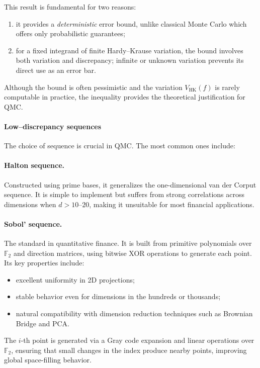 This result is fundamental for two reasons:
\begin{enumerate}
    \item it provides a \emph{deterministic} error bound, unlike classical Monte Carlo which offers only probabilistic guarantees;
    \item for a fixed integrand of finite Hardy--Krause variation,
          the bound involves both variation and discrepancy; infinite
          or unknown variation prevents its direct use as an error bar.
\end{enumerate}
Although the bound is often pessimistic and the variation $V_{\mathrm{HK}}(f)$ is rarely computable in practice, the inequality provides the theoretical justification for QMC.
\paragraph{Low--discrepancy sequences}

The choice of sequence is crucial in QMC. The most common ones include:

\paragraph{Halton sequence.}
Constructed using prime bases, it generalizes the one-dimensional van der Corput sequence.  
It is simple to implement but suffers from strong correlations across dimensions when $d>10$--$20$, making it unsuitable for most financial applications.

\paragraph{Sobol' sequence.}
The standard in quantitative finance.  
It is built from primitive polynomials over $\mathbb{F}_2$ and direction matrices, using bitwise XOR operations to generate each point.  
Its key properties include:
\begin{itemize}
    \item excellent uniformity in 2D projections;
    \item stable behavior even for dimensions in the hundreds or thousands;
    \item natural compatibility with dimension reduction techniques such as Brownian Bridge and PCA.
\end{itemize}
The $i$-th point is generated via a Gray code expansion and linear operations over $\mathbb{F}_2$, ensuring that small changes in the index produce nearby points, improving global space-filling behavior.


